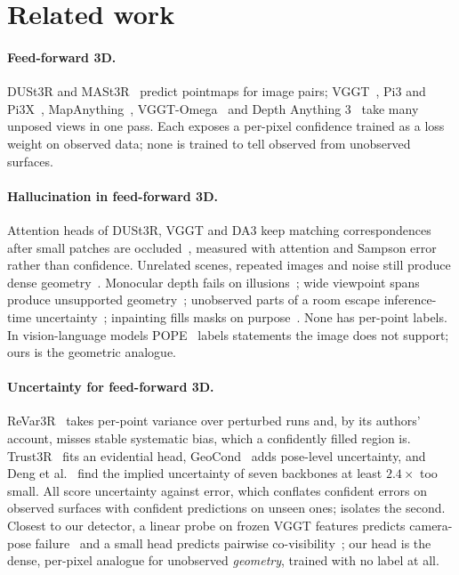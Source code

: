 \documentclass[10pt,twocolumn,letterpaper]{article}
\begin{document}
\section{Related work}
\label{sec:related}

\paragraph{Feed-forward 3D.}
DUSt3R and MASt3R~\cite{dust3r,mast3r} predict pointmaps for image pairs; VGGT~\cite{vggt}, Pi3 and Pi3X~\cite{pi3}, MapAnything~\cite{mapanything}, VGGT-Omega~\cite{vggtomega} and Depth Anything 3~\cite{da3} take many unposed views in one pass. Each exposes a per-pixel confidence trained as a loss weight on observed data; none is trained to tell observed from unobserved surfaces.

\paragraph{Hallucination in feed-forward 3D.}
Attention heads of DUSt3R, VGGT and DA3 keep matching correspondences after small patches are occluded~\cite{bratulic2025}, measured with attention and Sampson error rather than confidence. Unrelated scenes, repeated images and noise still produce dense geometry~\cite{paul2026}. Monocular depth fails on illusions~\cite{mirage}; wide viewpoint spans produce unsupported geometry~\cite{widerviews}; unobserved parts of a room escape inference-time uncertainty~\cite{sharperframes}; inpainting fills masks on purpose~\cite{freeinpaint}. None has per-point labels. In vision-language models POPE~\cite{pope} labels statements the image does not support; ours is the geometric analogue.

\paragraph{Uncertainty for feed-forward 3D.}
ReVar3R~\cite{revar3r} takes per-point variance over perturbed runs and, by its authors' account, misses stable systematic bias, which a confidently filled region is. Trust3R~\cite{trust3r} fits an evidential head, GeoCond~\cite{geocond} adds pose-level uncertainty, and Deng et al.~\cite{deng2026} find the implied uncertainty of seven backbones at least $2.4\times$ too small. All score uncertainty against error, which conflates confident errors on observed surfaces with confident predictions on unseen ones; \cur{} isolates the second. Closest to our detector, a linear probe on frozen VGGT features predicts camera-pose failure~\cite{vggtknows} and a small head predicts pairwise co-visibility~\cite{covggt}; our head is the dense, per-pixel analogue for unobserved \emph{geometry}, trained with no label at all.
\end{document}
